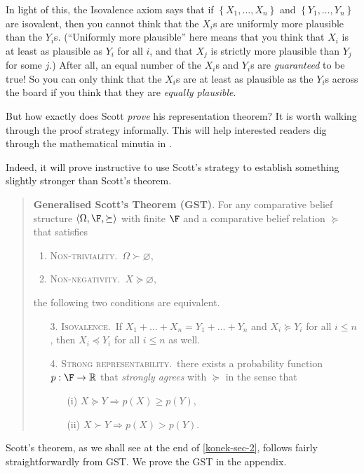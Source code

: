 In light of this, the Isovalence axiom says that if $\left\{X_1,\hdots,X_n\right\}$ and $\left\{Y_1,\hdots,Y_n\right\}$ are isovalent, then you cannot think that the $X_i$s are uniformly more plausible than the $Y_i$s. (``Uniformly more plausible'' here means that you think that $X_i$ is at least as plausible as $Y_i$ for all $i$, and that $X_j$ is strictly more plausible than $Y_j$ for some $j$.) After all, an equal number of the $X_i$s and $Y_i$s are \textit{guaranteed} to be true! So you can only think that the $X_i$s are at least as plausible as the $Y_i$s across the board if you think that they are \textit{equally plausible}.

But how exactly does Scott \textit{prove} his representation theorem? It is worth walking through the proof strategy informally. This will help interested readers dig through the mathematical minutia in \citet{Scott1964}.

Indeed, it will prove instructive to use Scott's strategy to establish something slightly stronger than Scott's theorem.
\begin{quote}
\textbf{Generalised Scott's Theorem (GST)}. For any comparative belief structure $\left<\Omega,\F,\succeq\right>$ with finite $\F$ and a comparative belief relation $\succeq$ that satisfies 
\begin{enumerate}
\item \textsc{Non-triviality}.\, $\Omega\succ \varnothing$,
\item \textsc{Non-negativity}.\, $X\succeq \varnothing$,
\end{enumerate}
the following two conditions are equivalent.
\begin{enumerate}
\item[3.] \textsc{Isovalence}.\, If $X_1+\ldots+X_n=Y_1+\ldots+Y_n$ and $X_i\succeq Y_i$ for all $i\leq n$, then $X_i\preceq Y_i$ for all $i\leq n$ as well.
\item[4.] \textsc{Strong representability}.\, there exists a probability function $p:\F\rightarrow\mathbb{R}$ that \textit{strongly agrees} with $\succeq$ in the sense that
\begin{enumerate}
\item[(i)] $X\succeq Y \Rightarrow p(X)\geq p(Y)$,
\item[(ii)] $X\succ Y \Rightarrow p(X)>p(Y)$.
\end{enumerate}
\end{enumerate}
\end{quote}
Scott's theorem, as we shall see at the end of \autoref{konek-sec-2}, follows fairly straightforwardly from GST. We prove the GST in the appendix.


